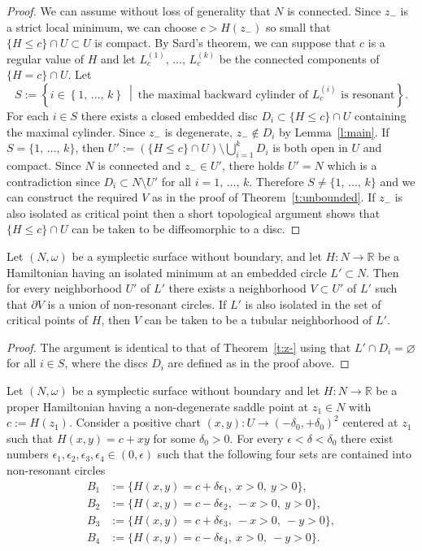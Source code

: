 \documentclass[AHL,Unicode,longabstracts,published]{cedram}
\newcommand{\R}{\mathbb{R}}
\newcommand{\p}{\partial}
\begin{document}
\begin{proof}
We can assume without loss of generality that $N$ is connected. Since $z_-$ is a strict local minimum, we can choose $c>H(z_-)$ so small that $\{H\leq c\}\cap U\subset U$ is compact. By Sard's theorem, we can suppose that $c$ is a regular value of $H$ and let $L_c^{(1)},\,\ldots,\,L_c^{(k)}$ be the connected components of $\{H=c\}\cap U$. Let
\[
S:=\left\{i\in \left\{1,\,\ldots,\,k\right\}\ \middle|\ \text{the maximal backward cylinder of $L_c^{(i)}$ is resonant}\right\}.
\]
For each $i\in S$ there exists a closed embedded disc $D_i\subset \{H\leq c\}\cap U$ containing the maximal cylinder. Since $z_-$ is degenerate, $z_-\notin D_i$ by Lemma~\ref{l:main}. If $S=\{1,\,\ldots,\,k\}$, then $U':=(\{H\leq c\}\cap U)\setminus\bigcup_{i=1}^kD_i$ is both open in $U$ and compact. Since $N$ is connected and $z_-\in U'$, there holds $U'=N$ which is a contradiction since $D_i\subset N\setminus U'$ for all $i=1,\,\ldots,\,k$. Therefore $S\neq\{1,\,\ldots,\,k\}$ and we can construct the required $V$ as in the proof of Theorem~\ref{t:unbounded}. If $z_-$ is also isolated as critical point then a short topological argument shows that $\{H\leq c\}\cap U$ can be taken to be diffeomorphic to a disc.
\end{proof}

\begin{theo}\label{t:L'}
Let $(N,\omega)$ be a symplectic surface without boundary, and let $H:N\to\R$ be a Hamiltonian having an isolated minimum at an embedded circle $L'\subset N$. Then for every neighborhood $U'$ of $L'$ there exists a neighborhood $V\subset U'$ of $L'$ such that $\p V$ is a union of non-resonant circles. If $L'$ is also isolated in the set of critical points of $H$, then $V$ can be taken to be a tubular neighborhood of $L'$.
\end{theo}

\begin{proof}
The argument is identical to that of Theorem~\ref{t:z-} using that $L'\cap D_i=\varnothing$ for all $i\in S$, where the discs $D_i$ are defined as in the proof above.
\end{proof}

\begin{theo}\label{t:ultimo}
Let $(N,\omega)$ be a symplectic surface without boundary and let $H:N\to\R$ be a proper Hamiltonian having a non-degenerate saddle point at $z_1\in N$ with $c:=H(z_1)$. Consider a positive chart $(x,y):U\to (-\delta_0,+\delta_0)^2$ centered at $z_1$ such that $H(x,y)=c+xy$ for some $\delta_0>0$. For every $\epsilon<\delta<\delta_0$ there exist numbers $\epsilon_1,\epsilon_2,\epsilon_3,\epsilon_4\in(0,\epsilon)$ such that the following four sets are contained into non-resonant circles
\begin{align*}
B_1&:=\big\{ H(x,y)=c+\delta\epsilon_1,\ x>0,\ y>0\big\},\\
B_2&:=\big\{ H(x,y)=c-\delta\epsilon_2,\ -x>0,\ y>0\big\},\\
B_3&:=\big\{ H(x,y)=c+\delta\epsilon_3,\ -x>0,\ -y>0\big\},\\
B_4&:=\big\{ H(x,y)=c-\delta\epsilon_4,\ x>0,\ -y>0\big\}.
\end{align*}
\end{theo}
\end{document}

